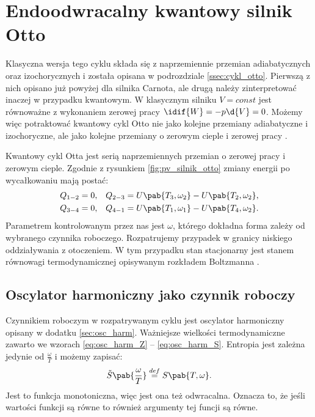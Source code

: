 
\section{Endoodwracalny kwantowy silnik Otto}
Klasyczna wersja tego cyklu składa się z naprzemiennie przemian adiabatycznych oraz izochorycznych i została opisana w podrozdziale \ref{ssec:cykl_otto}. Pierwszą z nich opisano już powyżej dla silnika Carnota, ale drugą należy zinterpretować inaczej w przypadku kwantowym. W klasycznym silniku \(V = const\) jest równoważne z wykonaniem zerowej pracy \(\idif{W} = - p \d{V} = 0\). Możemy więc potraktować kwantowy cykl Otto nie jako kolejne przemiany adiabatyczne i izochoryczne, ale jako kolejne przemiany o zerowym cieple i zerowej pracy \cite{myers}.

Kwantowy cykl Otta jest serią naprzemiennych przemian o zerowej pracy i zerowym cieple. Zgodnie z rysunkiem \ref{fig:pv_silnik_otto} zmiany energii po wycałkowaniu mają postać:
\begin{align*}
	Q_{1-2} &= 0, &
	Q_{2-3} &= U\pab{T_3,\omega_2} - U\pab{T_2,\omega_2}, \\
	Q_{3-4} &= 0, &
	Q_{4-1} &= U\pab{T_1,\omega_1} - U\pab{T_4,\omega_2}.
\end{align*}
Parametrem kontrolowanym przez nas jest \(\omega\), którego dokładna forma zależy od wybranego czynnika roboczego. Rozpatrujemy przypadek w granicy niskiego oddziaływania z otoczeniem. W tym przypadku stan stacjonarny jest stanem równowagi termodynamicznej opisywanym rozkładem Boltzmanna \cite{endo_otto}.

\subsection{Oscylator harmoniczny jako czynnik roboczy}
Czynnikiem roboczym w rozpatrywanym cyklu jest oscylator harmoniczny opisany w dodatku \ref{sec:osc_harm}. Ważniejsze wielkości termodynamiczne zawarto we wzorach \eqref{eq:osc_harm_Z} -- \eqref{eq:osc_harm_S}.
Entropia jest zależna jedynie od \(\frac{\omega}{T}\) i możemy zapisać:
\begin{equation*}
	\tilde{S}\pab{\frac{\omega}{T}} \overset{def}{=} S\pab{T,\omega}.
\end{equation*}
Jest to funkcja monotoniczna, więc jest ona też odwracalna. Oznacza to, że jeśli wartości funkcji są równe to również argumenty tej funcji są równe.


